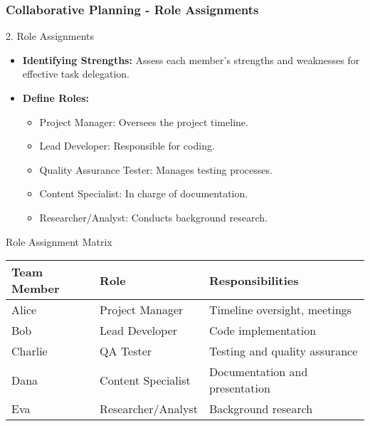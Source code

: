 \documentclass[aspectratio=169]{beamer}
\begin{document}
\begin{frame}[fragile]
    \frametitle{Collaborative Planning - Role Assignments}
    \begin{block}{2. Role Assignments}
        \begin{itemize}
            \item \textbf{Identifying Strengths:} Assess each member's strengths and weaknesses for effective task delegation.
            \item \textbf{Define Roles:}
            \begin{itemize}
                \item Project Manager: Oversees the project timeline.
                \item Lead Developer: Responsible for coding.
                \item Quality Assurance Tester: Manages testing processes.
                \item Content Specialist: In charge of documentation.
                \item Researcher/Analyst: Conducts background research.
            \end{itemize}
        \end{itemize}

        \begin{block}{Role Assignment Matrix}
            \begin{tabular}{|l|l|l|}
                \hline
                \textbf{Team Member} & \textbf{Role} & \textbf{Responsibilities} \\
                \hline
                Alice & Project Manager & Timeline oversight, meetings \\
                Bob & Lead Developer & Code implementation \\
                Charlie & QA Tester & Testing and quality assurance \\
                Dana & Content Specialist & Documentation and presentation \\
                Eva & Researcher/Analyst & Background research \\
                \hline
            \end{tabular}
        \end{block}
    \end{block}
\end{frame}
\end{document}
